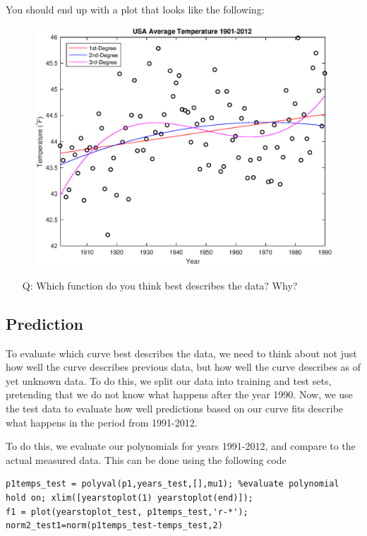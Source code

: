 \documentclass[12pt]{article}
\begin{document}
You should end up with a plot that looks like the following:

\begin{figure}[H]
\centering
\includegraphics[width=0.75\linewidth]{tempVsYearTrain.eps}
\end{figure}

\begin{enumerate}
\item[Q:] Which function do you think best describes the data? Why?
\end{enumerate}

\subsection{Prediction}
To evaluate which curve best describes the data, we need to think about not just how well the curve describes previous data, but how well the curve describes as of yet unknown data. To do this, we split our data into training and test sets, pretending that we do not know what happens after the year 1990. Now, we use the test data to evaluate how well predictions based on our curve fits describe what happens in the period from 1991-2012. 

To do this, we evaluate our polynomials for years 1991-2012, and compare to the actual measured data. This can be done using the following code

\begin{lstlisting}[frame=single]
%test 1-degree polynomial
p1temps_test = polyval(p1,years_test,[],mu1); %evaluate polynomial
hold on; xlim([yearstoplot(1) yearstoplot(end)]);
f1 = plot(yearstoplot_test, p1temps_test,'r-*');
norm2_test1=norm(p1temps_test-temps_test,2)
\end{lstlisting}
\end{document}
